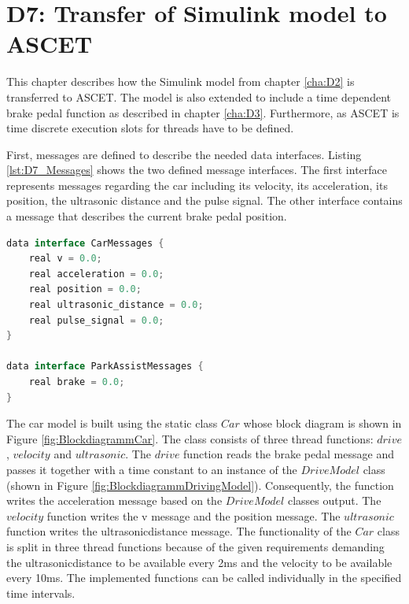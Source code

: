 \chapter{D7: Transfer of Simulink model to ASCET}\label{cha:D7}

This chapter describes how the Simulink model from chapter \ref{cha:D2} is transferred to ASCET. The model is also extended  to include a time dependent brake pedal function as described in chapter \ref{cha:D3}. Furthermore, as ASCET is time discrete execution slots for threads have to be defined.

First, messages are defined to describe the needed data interfaces. Listing \ref{lst:D7_Messages} shows the two defined message interfaces. The first interface represents messages regarding the car including its velocity, its acceleration, its position, the ultrasonic distance and the pulse signal. The other interface contains a message that describes the current brake pedal position.

\begin{lstlisting}[language=Java,basicstyle=\scriptsize, caption= Defined messages in ASCET,label= lst:D7_Messages]
data interface CarMessages {
	real v = 0.0;
	real acceleration = 0.0;
	real position = 0.0;
	real ultrasonic_distance = 0.0;
	real pulse_signal = 0.0;
}

data interface ParkAssistMessages {
	real brake = 0.0;
}
\end{lstlisting}

The car model is built using the static class $Car$ whose block diagram is shown in Figure \ref{fig:BlockdiagrammCar}. The class consists of three thread functions: $drive$, $velocity$ and $ultrasonic$. The $drive$ function reads the brake pedal message and passes it together with a time constant to an instance of the $DriveModel$ class (shown in Figure \ref{fig:BlockdiagrammDrivingModel}). Consequently, the function writes the acceleration message based on the $DriveModel$ classes output. The $velocity$ function writes the v message and the position message. The $ultrasonic$ function writes the ultrasonic\textunderscore distance message. The functionality of the $Car$ class is split in three thread functions because of the given requirements demanding the ultrasonic\textunderscore distance to be available every 2ms and the velocity to be available every 10ms. The implemented functions can be called individually in the specified time intervals.


